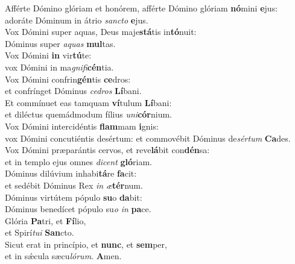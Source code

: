 \evenverse Afférte Dómino glóriam et honórem, afférte Dómino glóriam \textbf{nó}mini \textbf{e}jus:~\*\\
\evenverse adoráte Dóminum in átrio \textit{san}\textit{cto} \textbf{e}jus.\\
\oddverse Vox Dómini super aquas, Deus maje\textbf{stá}tis in\textbf{tó}nuit:~\*\\
\oddverse Dóminus super \textit{a}\textit{quas} \textbf{mul}tas.\\
\evenverse Vox Dómini \textbf{in} vir\textbf{tú}te:~\*\\
\evenverse vox Dómini in ma\textit{gni}\textit{fi}\textbf{cén}tia.\\
\oddverse Vox Dómini confrin\textbf{gén}tis \textbf{ce}dros:~\*\\
\oddverse et confrínget Dóminus \textit{ce}\textit{dros} \textbf{Lí}bani.\\
\evenverse Et commínuet eas tamquam \textbf{ví}tulum \textbf{Lí}bani:~\*\\
\evenverse et diléctus quemádmodum fílius \textit{u}\textit{ni}\textbf{cór}nium.\\
\oddverse Vox Dómini intercidéntis \textbf{flam}mam \textbf{i}gnis:~\*\\
\oddverse vox Dómini concutiéntis desértum: et commovébit Dóminus de\textit{sér}\textit{tum} \textbf{Ca}des.\\
\evenverse Vox Dómini præparántis cervos, et reve\textbf{lá}bit con\textbf{dén}sa:~\*\\
\evenverse et in templo ejus omnes \textit{di}\textit{cent} \textbf{gló}riam.\\
\oddverse Dóminus dilúvium inhabi\textbf{tá}re \textbf{fa}cit:~\*\\
\oddverse et sedébit Dóminus Rex \textit{in} \textit{æ}\textbf{tér}num.\\
\evenverse Dóminus virtútem pópulo \textbf{su}o \textbf{da}bit:~\*\\
\evenverse Dóminus benedícet pópulo su\textit{o} \textit{in} \textbf{pa}ce.\\
\oddverse Glória \textbf{Pa}tri, et \textbf{Fí}lio,~\*\\
\oddverse et Spirí\textit{tu}\textit{i} \textbf{San}cto.\\
\evenverse Sicut erat in princípio, et \textbf{nunc}, et \textbf{sem}per,~\*\\
\evenverse et in sǽcula sæcu\textit{ló}\textit{rum}. \textbf{A}men.\\
